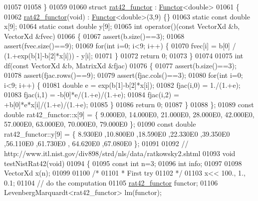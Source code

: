 \begin{DoxyCode}
01057 
01058 \}
01059 
01060 \textcolor{keyword}{struct }\hyperlink{structrat42__functor}{rat42\_functor} : \hyperlink{struct_functor}{Functor}<double>
01061 \{
01062     \hyperlink{structrat42__functor}{rat42\_functor}(\textcolor{keywordtype}{void}) : \hyperlink{struct_functor}{Functor}<double>(3,9) \{\}
01063     \textcolor{keyword}{static} \textcolor{keyword}{const} \textcolor{keywordtype}{double} x[9];
01064     \textcolor{keyword}{static} \textcolor{keyword}{const} \textcolor{keywordtype}{double} y[9];
01065     \textcolor{keywordtype}{int} operator()(\textcolor{keyword}{const} VectorXd &b, VectorXd &fvec)
01066     \{
01067         assert(b.size()==3);
01068         assert(fvec.size()==9);
01069         \textcolor{keywordflow}{for}(\textcolor{keywordtype}{int} i=0; i<9; i++) \{
01070             fvec[i] = b[0] / (1.+exp(b[1]-b[2]*x[i])) - y[i];
01071         \}
01072         \textcolor{keywordflow}{return} 0;
01073     \}
01074 
01075     \textcolor{keywordtype}{int} df(\textcolor{keyword}{const} VectorXd &b, MatrixXd &fjac)
01076     \{
01077         assert(b.size()==3);
01078         assert(fjac.rows()==9);
01079         assert(fjac.cols()==3);
01080         \textcolor{keywordflow}{for}(\textcolor{keywordtype}{int} i=0; i<9; i++) \{
01081             \textcolor{keywordtype}{double} e = exp(b[1]-b[2]*x[i]);
01082             fjac(i,0) = 1./(1.+e);
01083             fjac(i,1) = -b[0]*e/(1.+e)/(1.+e);
01084             fjac(i,2) = +b[0]*e*x[i]/(1.+e)/(1.+e);
01085         \}
01086         \textcolor{keywordflow}{return} 0;
01087     \}
01088 \};
01089 \textcolor{keyword}{const} \textcolor{keywordtype}{double} rat42\_functor::x[9] = \{ 9.000E0, 14.000E0, 21.000E0, 28.000E0, 42.000E0, 57.000E0, 63.000E0, 
      70.000E0, 79.000E0 \};
01090 \textcolor{keyword}{const} \textcolor{keywordtype}{double} rat42\_functor::y[9] = \{ 8.930E0 ,10.800E0 ,18.590E0 ,22.330E0 ,39.350E0 ,56.110E0 ,61.730E0 ,
      64.620E0 ,67.080E0 \};
01091 
01092 \textcolor{comment}{// http://www.itl.nist.gov/div898/strd/nls/data/ratkowsky2.shtml}
01093 \textcolor{keywordtype}{void} testNistRat42(\textcolor{keywordtype}{void})
01094 \{
01095   \textcolor{keyword}{const} \textcolor{keywordtype}{int} n=3;
01096   \textcolor{keywordtype}{int} info;
01097 
01098   VectorXd x(n);
01099 
01100   \textcolor{comment}{/*}
01101 \textcolor{comment}{   * First try}
01102 \textcolor{comment}{   */}
01103   x<< 100., 1., 0.1;
01104   \textcolor{comment}{// do the computation}
01105   \hyperlink{structrat42__functor}{rat42\_functor} functor;
01106   LevenbergMarquardt<rat42\_functor> lm(functor);

\end{DoxyCode}
